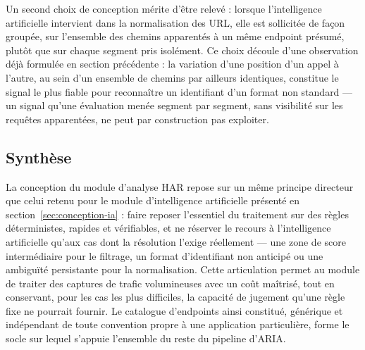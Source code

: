 Un second choix de conception mérite d'être relevé : lorsque l'intelligence artificielle intervient dans la normalisation des URL, elle est sollicitée de façon groupée, sur l'ensemble des chemins apparentés à un même endpoint présumé, plutôt que sur chaque segment pris isolément. Ce choix découle d'une observation déjà formulée en section précédente : la variation d'une position d'un appel à l'autre, au sein d'un ensemble de chemins par ailleurs identiques, constitue le signal le plus fiable pour reconnaître un identifiant d'un format non standard — un signal qu'une évaluation menée segment par segment, sans visibilité sur les requêtes apparentées, ne peut par construction pas exploiter.

\subsection*{Synthèse}

La conception du module d'analyse HAR repose sur un même principe directeur que celui retenu pour le module d'intelligence artificielle présenté en section~\ref{sec:conception-ia} : faire reposer l'essentiel du traitement sur des règles déterministes, rapides et vérifiables, et ne réserver le recours à l'intelligence artificielle qu'aux cas dont la résolution l'exige réellement — une zone de score intermédiaire pour le filtrage, un format d'identifiant non anticipé ou une ambiguïté persistante pour la normalisation. Cette articulation permet au module de traiter des captures de trafic volumineuses avec un coût maîtrisé, tout en conservant, pour les cas les plus difficiles, la capacité de jugement qu'une règle fixe ne pourrait fournir. Le catalogue d'endpoints ainsi constitué, générique et indépendant de toute convention propre à une application particulière, forme le socle sur lequel s'appuie l'ensemble du reste du pipeline d'ARIA.

